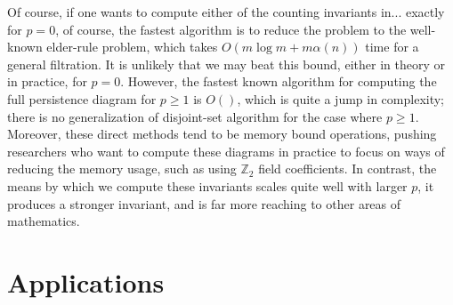 \documentclass[10pt]{article}
\numberwithin{equation}{section}
\newcommand{\+}{%
	\raisebox{0.18ex}{\scaleobj{0.55}{+}}
}
\theoremstyle{definition}
\begin{document}
Of course, if one wants to compute either of the counting invariants in... exactly for $p = 0$, of course, the fastest algorithm is to reduce the problem to the well-known elder-rule problem, which takes $O(m \log m + m \alpha(n))$ time for a general filtration. It is unlikely that we may beat this bound, either in theory or in practice, for $p = 0$.
However, the fastest known algorithm for computing the full persistence diagram for $p \geq 1$ is $O()$, which is quite a jump in complexity; there is no generalization of disjoint-set algorithm for the case where $p \geq 1$. 
Moreover, these direct methods tend to be memory bound operations, pushing researchers who want to compute these diagrams in practice to focus on ways of reducing the memory usage, such as using $\mathbb{Z}_2$ field coefficients. 
In contrast, the means by which we compute these invariants scales quite well with larger $p$, it produces a stronger invariant, and is far more reaching to other areas of mathematics. 


\newpage

\newpage

\section{Applications}\label{sec:applications}





%
\end{document}
